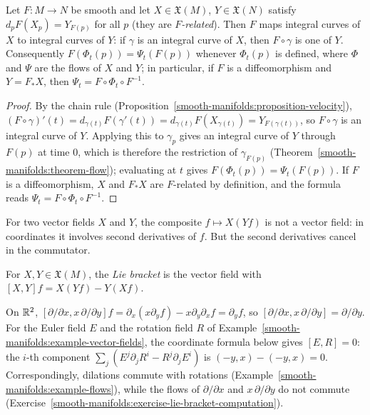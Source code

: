 \begin{proposition}\label{smooth-manifolds:proposition-naturality-flows}
Let $F \colon M \to N$ be smooth and let $X \in \mathfrak{X}(M)$, $Y \in \mathfrak{X}(N)$ satisfy $d_pF(X_p) = Y_{F(p)}$ for all $p$ (they are \emph{$F$-related}).
Then $F$ maps integral curves of $X$ to integral curves of $Y$: if $\gamma$ is an integral curve of $X$, then $F \circ \gamma$ is one of $Y$. Consequently
$F(\Phi_t(p)) = \Psi_t(F(p))$ whenever $\Phi_t(p)$ is defined, where $\Phi$ and $\Psi$ are the flows of $X$ and $Y$; in particular, if $F$ is a diffeomorphism and
$Y = F_*X$, then $\Psi_t = F \circ \Phi_t \circ F^{-1}$.
\end{proposition}

\begin{proof}
By the chain rule (Proposition~\ref{smooth-manifolds:proposition-velocity}), $(F \circ \gamma)'(t) = d_{\gamma(t)}F(\gamma'(t)) = d_{\gamma(t)}F(X_{\gamma(t)}) = Y_{F(\gamma(t))}$,
so $F \circ \gamma$ is an integral curve of $Y$. Applying this to $\gamma_p$ gives an integral curve of $Y$ through $F(p)$ at time $0$, which is therefore the
restriction of $\gamma_{F(p)}$ (Theorem~\ref{smooth-manifolds:theorem-flow}); evaluating at $t$ gives $F(\Phi_t(p)) = \Psi_t(F(p))$. If $F$ is a diffeomorphism,
$X$ and $F_*X$ are $F$-related by definition, and the formula reads $\Psi_t = F \circ \Phi_t \circ F^{-1}$.
\end{proof}

For two vector fields $X$ and $Y$, the composite $f \mapsto X(Yf)$ is not a vector field: in coordinates it involves second derivatives of $f$. But the second
derivatives cancel in the commutator.

\begin{definition}\label{smooth-manifolds:definition-bracket}
For $X, Y \in \mathfrak{X}(M)$, the \emph{Lie bracket} is the vector field with $[X, Y]f = X(Yf) - Y(Xf)$.
\end{definition}

\begin{example}\label{smooth-manifolds:example-bracket}
On $\mathbb{R}^2$, $[\partial/\partial x, x\,\partial/\partial y]f = \partial_x(x\partial_yf) - x\partial_y\partial_xf = \partial_yf$, so
$[\partial/\partial x, x\,\partial/\partial y] = \partial/\partial y$. For the Euler field $E$ and the rotation field $R$ of
Example~\ref{smooth-manifolds:example-vector-fields}, the coordinate formula below gives $[E, R] = 0$: the $i$-th component
$\sum_j(E^j\partial_jR^i - R^j\partial_jE^i)$ is $(-y, x) - (-y, x) = 0$. Correspondingly, dilations commute with rotations
(Example~\ref{smooth-manifolds:example-flows}), while the flows of $\partial/\partial x$ and $x\,\partial/\partial y$ do not commute
(Exercise~\ref{smooth-manifolds:exercise-lie-bracket-computation}).
\end{example}


